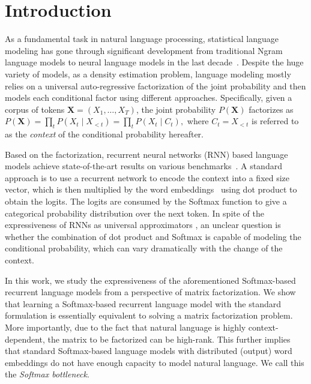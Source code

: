\section{Introduction} \label{sec:intro}

As a fundamental task in natural language processing, statistical language modeling has gone through significant development from traditional Ngram language models to neural language models in the last decade~\citep{bengio2003neural,mnih2007three,mikolov2010recurrent}. Despite the huge variety of models, as a density estimation problem, language modeling mostly relies on a universal auto-regressive factorization of the joint probability and then models each conditional factor using different approaches.
Specifically, given a corpus of tokens $\mathbf{X} = (X_1, \dots, X_T)$, the joint probability $P(\mathbf{X})$ factorizes as
$ P(\mathbf{X}) = \prod_{t} P(X_t \mid X_{<t}) = \prod_{t} P(X_t \mid C_t), $
where $C_t = X_{<t}$ is referred to as the \textit{context} of the conditional probability hereafter. 

Based on the factorization, recurrent neural networks (RNN) based language models achieve state-of-the-art results on various benchmarks~\citep{merity2017regularizing,melis2017state,krause2017dynamic}. A standard approach is to use a recurrent network to encode the context into a fixed size vector, which is then multiplied by the word embeddings~\citep{inan2016tying,press2017using} using dot product to obtain the logits. The logits are consumed by the Softmax function to give a categorical probability distribution over the next token.
In spite of the expressiveness of RNNs as universal approximators \citep{schafer2006recurrent}, an unclear question is whether the combination of dot product and Softmax is capable of modeling the conditional probability, which can vary dramatically with the change of the context.


In this work, we study the expressiveness of the aforementioned Softmax-based recurrent language models from a perspective of matrix factorization. We show that learning a Softmax-based recurrent language model with the standard formulation is essentially equivalent to solving a matrix factorization problem. More importantly, due to the fact that natural language is highly context-dependent, the matrix to be factorized can be high-rank. This further implies that standard Softmax-based language models with distributed (output) word embeddings do not have enough capacity to model natural language. We call this the {\em Softmax bottleneck}.

